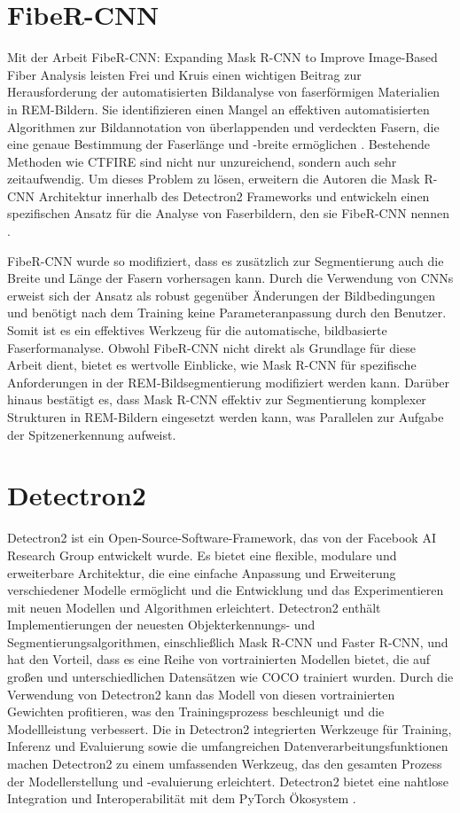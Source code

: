 \newpage
\section{FibeR-CNN}
Mit der Arbeit \glqq FibeR-CNN: Expanding Mask R-CNN to Improve Image-Based Fiber Analysis\grqq{} leisten Frei und Kruis einen wichtigen Beitrag zur Herausforderung der automatisierten Bildanalyse von faserförmigen Materialien in REM-Bildern. Sie identifizieren einen Mangel an effektiven automatisierten Algorithmen zur Bildannotation von überlappenden und verdeckten Fasern, die eine genaue Bestimmung der Faserlänge und -breite ermöglichen \cite{Frei_2021}. Bestehende Methoden wie CTFIRE sind nicht nur unzureichend, sondern auch sehr zeitaufwendig.
Um dieses Problem zu lösen, erweitern die Autoren die Mask R-CNN Architektur innerhalb des Detectron2 Frameworks und entwickeln einen spezifischen Ansatz für die Analyse von Faserbildern, den sie FibeR-CNN nennen \cite{wu2019detectron2}\cite{fiberrcnn}.

FibeR-CNN wurde so modifiziert, dass es zusätzlich zur Segmentierung auch die Breite und Länge der Fasern vorhersagen kann. Durch die Verwendung von CNNs erweist sich der Ansatz als robust gegenüber Änderungen der Bildbedingungen und benötigt nach dem Training keine Parameteranpassung durch den Benutzer. Somit ist es ein effektives Werkzeug für die automatische, bildbasierte Faserformanalyse.
Obwohl FibeR-CNN nicht direkt als Grundlage für diese Arbeit dient, bietet es wertvolle Einblicke, wie Mask R-CNN für spezifische Anforderungen in der REM-Bildsegmentierung modifiziert werden kann. Darüber hinaus bestätigt es, dass Mask R-CNN effektiv zur Segmentierung komplexer Strukturen in REM-Bildern eingesetzt werden kann, was Parallelen zur Aufgabe der Spitzenerkennung aufweist.
\section{Detectron2}
Detectron2 ist ein Open-Source-Software-Framework, das von der Facebook AI Research Group entwickelt wurde. Es bietet eine flexible, modulare und erweiterbare Architektur, die eine einfache Anpassung und Erweiterung verschiedener Modelle ermöglicht und die Entwicklung und das Experimentieren mit neuen Modellen und Algorithmen erleichtert. Detectron2 enthält Implementierungen der neuesten Objekterkennungs- und Segmentierungsalgorithmen, einschließlich Mask R-CNN und Faster R-CNN, und hat den Vorteil, dass es eine Reihe von vortrainierten Modellen bietet, die auf großen und unterschiedlichen Datensätzen wie COCO trainiert wurden. Durch die Verwendung von Detectron2 kann das Modell von diesen vortrainierten Gewichten profitieren, was den Trainingsprozess beschleunigt und die Modellleistung verbessert. Die in Detectron2 integrierten Werkzeuge für Training, Inferenz und Evaluierung sowie die umfangreichen Datenverarbeitungsfunktionen machen Detectron2 zu einem umfassenden Werkzeug, das den gesamten Prozess der Modellerstellung und -evaluierung erleichtert. Detectron2 bietet eine nahtlose Integration und Interoperabilität mit dem PyTorch Ökosystem \cite{wu2019detectron2}.